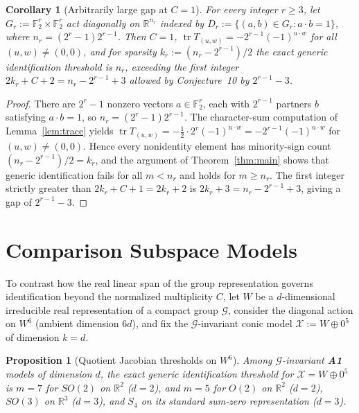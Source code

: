 \documentclass[11pt]{article}
\theoremstyle{plain}
\newtheorem{proposition}[theorem]{Proposition}
\newtheorem{corollary}[theorem]{Corollary}
\theoremstyle{definition}
\theoremstyle{remark}
\DeclareMathOperator{\tr}{tr}
\begin{document}
\begin{corollary}[Arbitrarily large gap at $C = 1$]\label{cor:gap}
For every integer $r \ge 3$, let $G_r := \mathbb{F}_2^r \times \mathbb{F}_2^r$ act diagonally on $\mathbb{R}^{n_r}$ indexed by $D_r := \{(a, b) \in G_r : a \cdot b = 1\}$, where $n_r = (2^r - 1)2^{r-1}$.
Then $C = 1$, $\tr T_{(u,w)} = -2^{r-1}(-1)^{u\cdot w}$ for all $(u, w) \neq (0, 0)$, and for sparsity $k_r := (n_r - 2^{r-1})/2$ the exact generic identification threshold is $n_r$, exceeding the first integer $2k_r + C + 2 = n_r - 2^{r-1} + 3$ allowed by Conjecture~10 by $2^{r-1} - 3$.
\end{corollary}

\begin{proof}
There are $2^r - 1$ nonzero vectors $a \in \mathbb{F}_2^r$, each with $2^{r-1}$ partners $b$ satisfying $a \cdot b = 1$, so $n_r = (2^r - 1)2^{r-1}$.
The character-sum computation of Lemma~\ref{lem:trace} yields $\tr T_{(u,w)} = -\frac{1}{2}\cdot 2^r (-1)^{u\cdot w} = -2^{r-1}(-1)^{u\cdot w}$ for $(u, w) \neq (0, 0)$.
Hence every nonidentity element has minority-sign count $(n_r - 2^{r-1})/2 = k_r$, and the argument of Theorem~\ref{thm:main} shows that generic identification fails for all $m < n_r$ and holds for $m \ge n_r$.
The first integer strictly greater than $2k_r + C + 1 = 2k_r + 2$ is $2k_r + 3 = n_r - 2^{r-1} + 3$, giving a gap of $2^{r-1} - 3$.
\end{proof}

\section{Comparison Subspace Models}

To contrast how the real linear span of the group representation governs identification beyond the normalized multiplicity $C$, let $W$ be a $d$-dimensional irreducible real representation of a compact group $\mathcal{G}$, consider the diagonal action on $W^6$ (ambient dimension $6d$), and fix the $\mathcal{G}$-invariant conic model $\mathcal{X} := W \oplus 0^5$ of dimension $k = d$.

\begin{proposition}[Quotient Jacobian thresholds on $W^6$]\label{prop:subspace}
Among $\mathcal{G}$-invariant \textup{\textbf{A1}} models of dimension $d$, the exact generic identification threshold for $\mathcal{X} = W \oplus 0^5$ is $m = 7$ for $SO(2)$ on $\mathbb{R}^2$ ($d = 2$), and $m = 5$ for $O(2)$ on $\mathbb{R}^2$ ($d = 2$), $SO(3)$ on $\mathbb{R}^3$ ($d = 3$), and $S_4$ on its standard sum-zero representation ($d = 3$).
\end{proposition}
\end{document}
